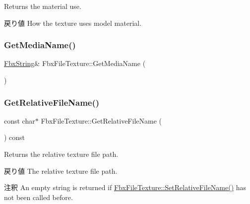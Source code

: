 Returns the material use. \begin{DoxyReturn}{戻り値}
How the texture uses model material. 
\end{DoxyReturn}
\mbox{\label{class_fbx_file_texture_afbd2a201ca55d31987446e33133f53cd}} 
\subsubsection{\texorpdfstring{Get\+Media\+Name()}{GetMediaName()}}
{\footnotesize\ttfamily \hyperlink{class_fbx_string}{Fbx\+String}\& Fbx\+File\+Texture\+::\+Get\+Media\+Name (\begin{DoxyParamCaption}{ }\end{DoxyParamCaption})}

\mbox{\label{class_fbx_file_texture_a66dda210b8186cedba3d7543ce77a363}} 
\subsubsection{\texorpdfstring{Get\+Relative\+File\+Name()}{GetRelativeFileName()}}
{\footnotesize\ttfamily const char$\ast$ Fbx\+File\+Texture\+::\+Get\+Relative\+File\+Name (\begin{DoxyParamCaption}{ }\end{DoxyParamCaption}) const}

Returns the relative texture file path. \begin{DoxyReturn}{戻り値}
The relative texture file path. 
\end{DoxyReturn}
\begin{DoxyRemark}{注釈}
An empty string is returned if \hyperlink{class_fbx_file_texture_a460992bc85c4087da594b60da1f2c6f5}{Fbx\+File\+Texture\+::\+Set\+Relative\+File\+Name()} has not been called before. 
\end{DoxyRemark}
\mbox{\label{class_fbx_file_texture_ad9c266407fb8319af33c1969144d6d1e}} 

